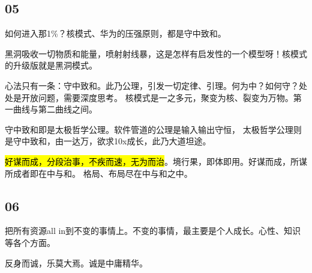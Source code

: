 \subsection{05}

如何进入那1\%？核模式、华为的压强原则，都是守中致和。

黑洞吸收一切物质和能量，喷射射线暴，这是怎样有启发性的一个模型呀！核模式的升级版就是黑洞模式。

心法只有一条：守中致和。此乃公理，引发一切定律、引理。何为中？如何守？处处是开放问题，需要深度思考。
核模式是一之多元，聚变为核、裂变为万物。第一曲线与第二曲线之间。

守中致和即是太极哲学公理。软件管道的公理是输入输出守恒，
太极哲学公理则是守中致和，由一达万，欲求10x成长，此乃大道坦途。

\hl{好谋而成，分段治事，不疾而速，无为而治}。境行果，即体即用。好谋而成，所谋所成者即在中与和。
格局、布局尽在中与和之中。

\subsection{06}

把所有资源all in到不变的事情上。不变的事情，最主要是个人成长。心性、知识等各个方面。

反身而诚，乐莫大焉。诚是中庸精华。
